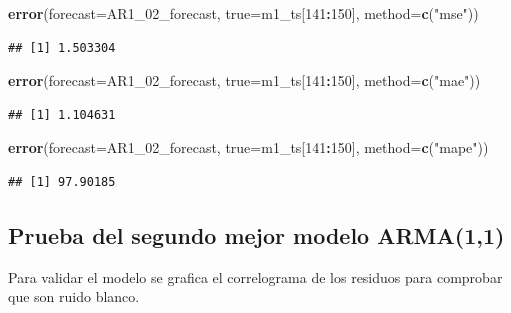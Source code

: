 \documentclass[
  11pt,
]{article}
\newenvironment{Shaded}{\begin{snugshade}}{\end{snugshade}}
\newcommand{\DataTypeTok}[1]{\textcolor[rgb]{0.13,0.29,0.53}{#1}}
\newcommand{\DecValTok}[1]{\textcolor[rgb]{0.00,0.00,0.81}{#1}}
\newcommand{\KeywordTok}[1]{\textcolor[rgb]{0.13,0.29,0.53}{\textbf{#1}}}
\newcommand{\NormalTok}[1]{#1}
\newcommand{\OperatorTok}[1]{\textcolor[rgb]{0.81,0.36,0.00}{\textbf{#1}}}
\newcommand{\StringTok}[1]{\textcolor[rgb]{0.31,0.60,0.02}{#1}}
\begin{document}
\begin{Shaded}
\begin{Highlighting}[]
\KeywordTok{error}\NormalTok{(}\DataTypeTok{forecast=}\NormalTok{AR1_}\DecValTok{02}\NormalTok{_forecast, }\DataTypeTok{true=}\NormalTok{m1_ts[}\DecValTok{141}\OperatorTok{:}\DecValTok{150}\NormalTok{], }\DataTypeTok{method=}\KeywordTok{c}\NormalTok{(}\StringTok{"mse"}\NormalTok{))}
\end{Highlighting}
\end{Shaded}

\begin{verbatim}
## [1] 1.503304
\end{verbatim}

\begin{Shaded}
\begin{Highlighting}[]
\KeywordTok{error}\NormalTok{(}\DataTypeTok{forecast=}\NormalTok{AR1_}\DecValTok{02}\NormalTok{_forecast, }\DataTypeTok{true=}\NormalTok{m1_ts[}\DecValTok{141}\OperatorTok{:}\DecValTok{150}\NormalTok{], }\DataTypeTok{method=}\KeywordTok{c}\NormalTok{(}\StringTok{"mae"}\NormalTok{))}
\end{Highlighting}
\end{Shaded}

\begin{verbatim}
## [1] 1.104631
\end{verbatim}

\begin{Shaded}
\begin{Highlighting}[]
\KeywordTok{error}\NormalTok{(}\DataTypeTok{forecast=}\NormalTok{AR1_}\DecValTok{02}\NormalTok{_forecast, }\DataTypeTok{true=}\NormalTok{m1_ts[}\DecValTok{141}\OperatorTok{:}\DecValTok{150}\NormalTok{], }\DataTypeTok{method=}\KeywordTok{c}\NormalTok{(}\StringTok{"mape"}\NormalTok{))}
\end{Highlighting}
\end{Shaded}

\begin{verbatim}
## [1] 97.90185
\end{verbatim}

\clearpage

\hypertarget{prueba-del-segundo-mejor-modelo-arma11}{%
\subsection{Prueba del segundo mejor modelo
ARMA(1,1)}\label{prueba-del-segundo-mejor-modelo-arma11}}

Para validar el modelo se grafica el correlograma de los residuos para
comprobar que son ruido blanco.
\end{document}
